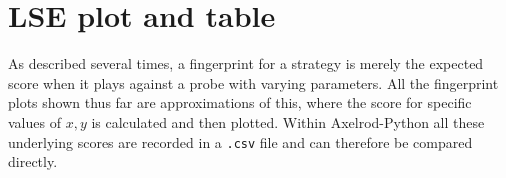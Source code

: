 






\section{LSE plot and table}\label{sec:lse}
As described several times, a fingerprint for a strategy is merely the expected score when it plays against a probe with varying parameters.
All the fingerprint plots shown thus far are approximations of this, where the score for specific values of $x, y$ is calculated and then plotted.
Within Axelrod-Python all these underlying scores are recorded in a \texttt{.csv} file and can therefore be compared directly.

